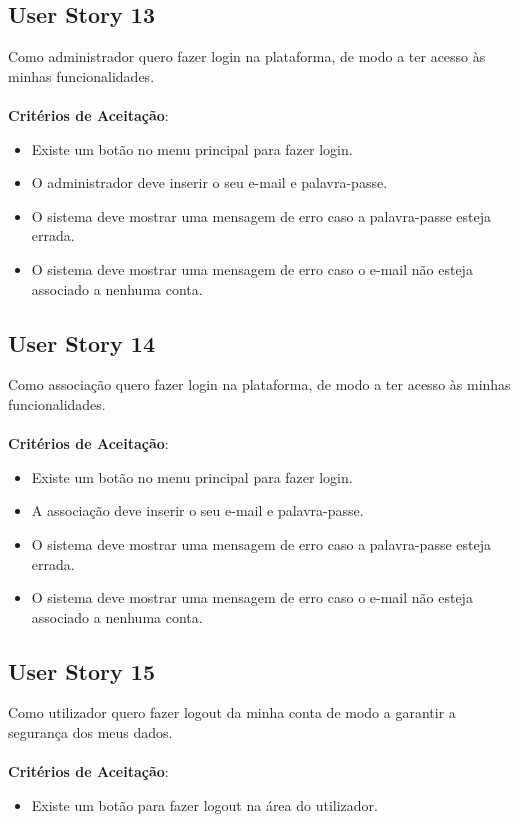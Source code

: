 \documentclass[a4paper,11pt]{article}
\begin{document}
\subsection{User Story 13}
Como administrador quero fazer login na plataforma, de modo a ter acesso às minhas funcionalidades.\\\\
\textbf{Critérios de Aceitação}:
\begin{itemize}
  \item Existe um botão no menu principal para fazer login.
  \item O administrador deve inserir o seu e-mail e palavra-passe.
  \item O sistema deve mostrar uma mensagem de erro caso a palavra-passe esteja errada.
  \item O sistema deve mostrar uma mensagem de erro caso o e-mail não esteja associado a nenhuma conta.
\end{itemize}

\subsection{User Story 14}
Como associação quero fazer login na plataforma, de modo a ter acesso às minhas funcionalidades.\\\\
\textbf{Critérios de Aceitação}:
\begin{itemize}
  \item Existe um botão no menu principal para fazer login.
  \item A associação deve inserir o seu e-mail e palavra-passe.
  \item O sistema deve mostrar uma mensagem de erro caso a palavra-passe esteja errada.
  \item O sistema deve mostrar uma mensagem de erro caso o e-mail não esteja associado a nenhuma conta.
\end{itemize}

\subsection{User Story 15}
Como utilizador quero fazer logout da minha conta de modo a garantir a segurança dos meus dados.\\\\
\textbf{Critérios de Aceitação}:
\begin{itemize}
  \item Existe um botão para fazer logout na área do utilizador.
\end{itemize}
\end{document}
